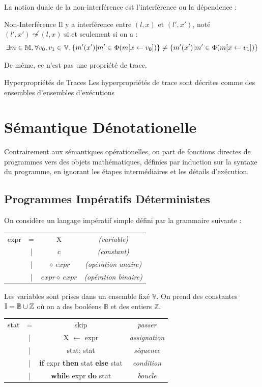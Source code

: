 \documentclass{cours}
\begin{document}
La notion duale de la non-interférence est l'interférence ou la dépendence :
\begin{définition}{Non-Interférence}{}
Il y a interférence entre $(l, x)$ et $(l', x')$, noté $(l',x') \not\leadsto (l, x)$ si et seulement si on a :
\[
	\exists m \in \mathbb{M}, \forall v_{0}, v_{1} \in \mathbb{V}, \left\{m'(x')\middle| m' \in \Phi(m[x \gets v_{0}])\right\} \neq \left\{m'(x')\middle| m'\in \Phi(m[x \gets v_{1}])\right\}
\]
\end{définition}
De même, ce n'est pas une propriété de trace.

\begin{définition}{Hyperpropriétés de Traces}{}
Les hyperpropriétés de trace sont décrites comme des ensembles d'ensembles d'exécutions
\end{définition}

\section{Sémantique Dénotationelle}
Contrairement aux sémantiques opérationelles, on part de fonctions directes de programmes vers des objets mathématiques, définies par induction sur la syntaxe du programme, en ignorant les étapes intermédiaires et les détails d'exécution.

\subsection{Programmes Impératifs Déterministes}
On considère un langage impératif simple défini par la grammaire suivante :
\begin{center}
	\begin{tabular}{ccc>{\it}c}
		expr & = & X                     & (variable)          \\
		     & | & c                     & (constant)          \\
		     & | & $\diamond\ expr$      & (opération unaire)  \\
		     & | & $expr \diamond\ expr$ & (opération binaire)
	\end{tabular}
\end{center}

Les variables sont prises dans un ensemble fixé $\mathbb{V}$. On prend des constantes $\mathbb{I} = \mathbb{B} \cup \mathbb{Z}$ où on a des booléens $\mathbb{B}$ et des entiers $\mathbb{Z}$.\\
\begin{center}
	\begin{tabular}{ccc>{\it}c}
		stat & = & \rm skip                                      & passer      \\
		     & | & X $\gets$ expr                                & assignation \\
		     & | & stat; stat                                    & séquence    \\
		     & | & {\bf if} expr {\bf then} stat {\bf else} stat & condition   \\
		     & | & {\bf while} expr {\bf do} stat                & boucle
	\end{tabular}
\end{center}
\end{document}
